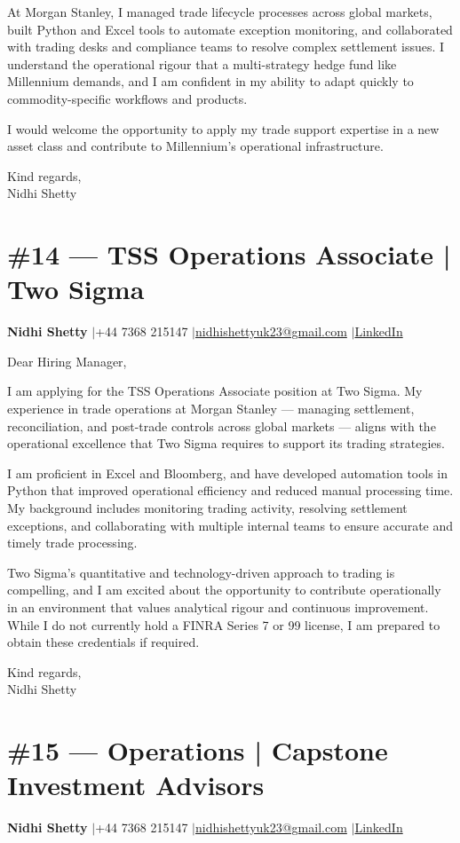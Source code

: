 \documentclass[11pt,a4paper]{article}
\makeatletter
\newcommand{\coverheader}{%
\begin{flushleft}
{\bfseries Nidhi Shetty} \enspace$\vert$\enspace +44 7368 215147 \enspace$\vert$\enspace \href{mailto:nidhishettyuk23@gmail.com}{nidhishettyuk23@gmail.com} \enspace$\vert$\enspace \href{https://www.linkedin.com/in/nidhi-shetty23-1841b7181}{LinkedIn}
\end{flushleft}
\vspace{4pt}
}
\makeatother
\begin{document}
At Morgan Stanley, I managed trade lifecycle processes across global markets, built Python and Excel tools to automate exception monitoring, and collaborated with trading desks and compliance teams to resolve complex settlement issues. I understand the operational rigour that a multi-strategy hedge fund like Millennium demands, and I am confident in my ability to adapt quickly to commodity-specific workflows and products.

I would welcome the opportunity to apply my trade support expertise in a new asset class and contribute to Millennium's operational infrastructure.

\vspace{8pt}
Kind regards,\\
Nidhi Shetty

\newpage
\section{\#14 --- TSS Operations Associate | Two Sigma}
\coverheader

Dear Hiring Manager,

I am applying for the TSS Operations Associate position at Two Sigma. My experience in trade operations at Morgan Stanley --- managing settlement, reconciliation, and post-trade controls across global markets --- aligns with the operational excellence that Two Sigma requires to support its trading strategies.

I am proficient in Excel and Bloomberg, and have developed automation tools in Python that improved operational efficiency and reduced manual processing time. My background includes monitoring trading activity, resolving settlement exceptions, and collaborating with multiple internal teams to ensure accurate and timely trade processing.

Two Sigma's quantitative and technology-driven approach to trading is compelling, and I am excited about the opportunity to contribute operationally in an environment that values analytical rigour and continuous improvement. While I do not currently hold a FINRA Series 7 or 99 license, I am prepared to obtain these credentials if required.

\vspace{8pt}
Kind regards,\\
Nidhi Shetty

\newpage
\section{\#15 --- Operations | Capstone Investment Advisors}
\coverheader
\end{document}
